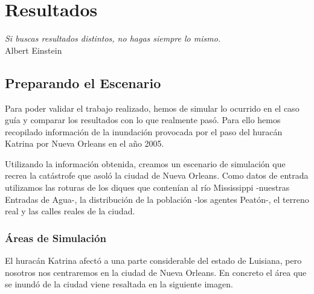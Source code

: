 \chapter{Resultados} \label{cap6}

\begin{flushright}
\begin{minipage}{7.85cm}
    {\em Si buscas resultados distintos, no hagas siempre lo mismo.} \\ Albert
    Einstein
\end{minipage}
\end{flushright}

\vspace*{5mm}

\section{Preparando el Escenario}

Para poder validar el trabajo realizado, hemos de simular lo ocurrido en el
caso guía y comparar los resultados con lo que realmente pasó. Para ello hemos
recopilado información de la inundación provocada por el paso del huracán
Katrina por Nueva Orleans en el año 2005.

Utilizando la información obtenida, creamos un escenario de simulación que
recrea la catástrofe que asoló la ciudad de Nueva Orleans. Como datos de
entrada utilizamos las roturas de los diques que contenían al río Mississippi
-nuestras Entradas de Agua-, la distribución de la población -los agentes
Peatón-, el terreno real y las calles reales de la ciudad.

\subsection{Áreas de Simulación}

El huracán Katrina afectó a una parte considerable del estado de Luisiana, pero
nosotros nos centraremos en la ciudad de Nueva Orleans. En concreto el área que
se inundó de la ciudad viene resaltada en la siguiente imagen.

